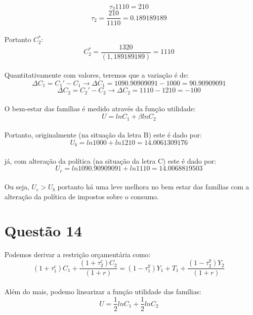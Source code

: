 \documentclass{article}
\begin{document}
\begin{equation}
    \tau_2 1110 = 210
\end{equation}
\begin{equation}
    \tau_2 = \frac{210}{1110} = 0.189189189
\end{equation}
\\
Portanto $C_2^*$:
\begin{equation}
    C_2^*=\frac{1320}{(1,189189189)} = 1110
\end{equation}
\\
Quantitativamente com valores, teremos que a variação é de:
\begin{equation}
    \Delta C_1 = C_1' - C_1 \to \Delta C_1 = 1090.90909091 - 1000 = 90.90909091
\end{equation}
\begin{equation}
    \Delta C_2 = C_2' - C_2 \to \Delta C_2 = 1110 - 1210 = -100
\end{equation}
\\
O bem-estar das famílias é medido através da função utilidade:
\begin{equation}
    U=ln C_1 + \beta ln C_2
\end{equation}
\\
Portanto, originalmente (na situação da letra B) este é dado por:
\begin{equation}
    U_b=ln 1000 + ln 1210 = 14.0061309176
\end{equation}
\\
já, com alteração da política (na situação da letra C) este é dado por:
\begin{equation}
    U_c=ln 1090.90909091 + ln 1110 = 14.0068819503
\end{equation}
\\
Ou seja, $U_c > U_b$ portanto há uma leve melhora no bem estar das famílias com a alteração da política de impostos sobre o consumo.
\clearpage
\section*{Questão 14}
Podemos derivar a restrição orçamentária como:
\begin{equation}
    (1+\tau_1^c)C_1 + \frac{(1+\tau_2^c)C_2}{(1+r)} = (1 -\tau_1^y)Y_1 + T_1 + \frac{(1 - \tau_2^y)Y_2}{(1+r)}
\end{equation}
\\
Além do mais, podemo linearizar a função utilidade das famílias:
\begin{equation}\label{eq:14roi}
    U = \frac{1}{2}ln C_1 + \frac{1}{2}ln C_2
\end{equation}
\end{document}
